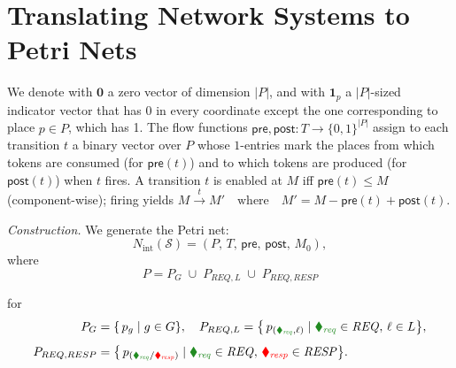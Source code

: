 \clearpage
\section{Translating Network Systems to Petri Nets}
\label{appendix:NS-to-PN-formulation}


We denote with \(\mathbf0\) a zero vector of dimension \(|P|\), and with \(\mathbf1_{p}\) a \(|P|\)-sized indicator vector that has 0 in every coordinate except the one corresponding to place \(p \in P\), which has 1. 
% 
The flow functions $\mathsf{pre},\mathsf{post}:T\to\{0,1\}^{|P|}$ assign to each transition $t$ a binary vector over $P$ whose $1$-entries mark the places from which tokens are consumed (for $\mathsf{pre}(t)$) and to which tokens are produced (for $\mathsf{post}(t)$) when $t$ fires.
A transition $t$ is enabled at $M$ iff $\mathsf{pre}(t)\le M$ (component-wise); firing yields
\(
M\xrightarrow{t}M' \quad\text{where}\quad M' = M-\mathsf{pre}(t)+\mathsf{post}(t)
\).	

\medskip
\textit{Construction.}
We generate the Petri net:
\[
N_{\mathrm{int}}(\mathcal S)
= (P,\,T,\,\mathsf{pre},\,\mathsf{post},\,M_0),
\]
where
\[
P
=
P_G \;\cup\; P_{REQ,L} \;\cup\; P_{REQ,RESP}
\]

for 
\[
\begin{aligned}
	P_G
	&= \{\,p_g \mid g\in G\},\quad
	P_{REQ,L}
	= \bigl\{\,p_{({\color{ForestGreen}\blacklozenge_{\mathit{req}}},\ell)}
	\mid {\color{ForestGreen}\blacklozenge_{\mathit{req}}}\in\mathit{REQ},\,\ell\in  L\bigr\},\\[1ex]
	P_{REQ,RESP}
	&= \bigl\{\,p_{({\color{ForestGreen}\blacklozenge_{\mathit{req}}}/{\color{red}\blacklozenge_{\mathit{resp}}})}
	\mid {\color{ForestGreen}\blacklozenge_{\mathit{req}}}\in\mathit{REQ},\,
	{\color{red}\blacklozenge_{\mathit{resp}}}\in\mathit{RESP}\bigr\}.
\end{aligned}
\]



